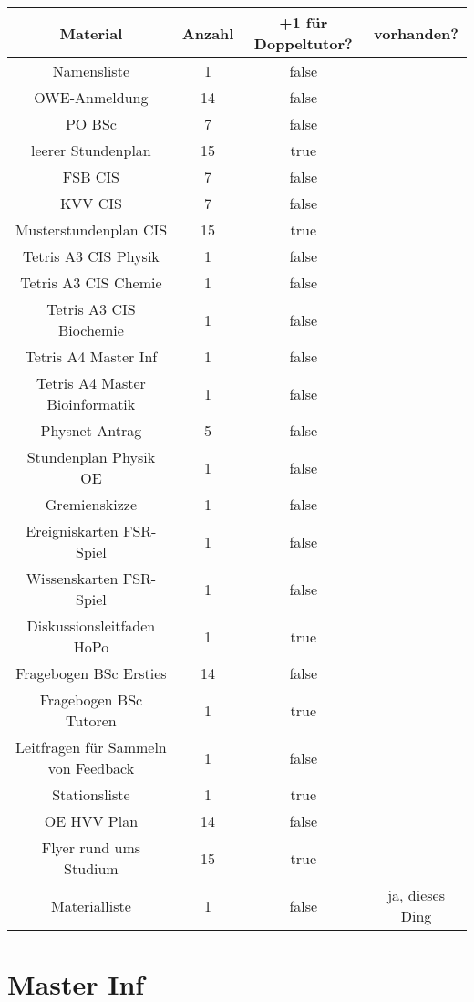 \documentclass[10pt,a4paper,oneside,ngerman,numbers=noenddot]{scrartcl}
\begin{document}
	\begin{tabular}{c|c|c|c}
		\textbf{Material} & \textbf{Anzahl} & \textbf{+1 für Doppeltutor?} & \textbf{vorhanden?} \\
		\hline
		Namensliste & 1 & false & \\
		\hline
		OWE-Anmeldung & 14 & false & \\
		\hline
		PO BSc & 7 & false & \\
		\hline
		leerer Stundenplan & 15 & true & \\
		\hline
		FSB CIS & 7 & false & \\
		\hline
		KVV CIS & 7 & false & \\
		\hline
		Musterstundenplan CIS & 15 & true & \\
		\hline
		Tetris A3 CIS Physik & 1 & false & \\
		\hline
		Tetris A3 CIS Chemie & 1 & false & \\
		\hline
		Tetris A3 CIS Biochemie & 1 & false & \\
		\hline
		Tetris A4 Master Inf & 1 & false & \\
		\hline
		Tetris A4 Master Bioinformatik & 1 & false & \\
		\hline
		Physnet-Antrag & 5 & false & \\
		\hline
		Stundenplan Physik OE & 1 & false & \\
		\hline
		Gremienskizze & 1 & false & \\
		\hline
		Ereigniskarten FSR-Spiel & 1 & false & \\
		\hline
		Wissenskarten FSR-Spiel & 1 & false & \\
		\hline
		Diskussionsleitfaden HoPo & 1 & true & \\
		\hline
		Fragebogen BSc Ersties & 14 & false & \\
		\hline
		Fragebogen BSc Tutoren & 1 & true & \\
		\hline
		Leitfragen für Sammeln von Feedback & 1 & false & \\
		\hline
		Stationsliste & 1 & true & \\
		\hline
		OE HVV Plan & 14 & false & \\
		\hline
		Flyer rund ums Studium & 15 & true & \\
		\hline
		Materialliste & 1 & false & ja, dieses Ding \\
	\end{tabular}

\section{Master Inf}
\end{document}
